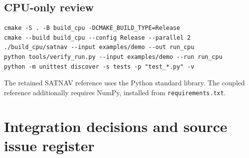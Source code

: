 \documentclass[11pt,a4paper]{article}
\newcommand{\code}[1]{\texttt{#1}}
\begin{document}
\subsection{CPU-only review}
\begin{lstlisting}
cmake -S . -B build_cpu -DCMAKE_BUILD_TYPE=Release
cmake --build build_cpu --config Release --parallel 2
./build_cpu/satnav --input examples/demo --out run_cpu
python tools/verify_run.py --input examples/demo --run run_cpu
python -m unittest discover -s tests -p "test_*.py" -v
\end{lstlisting}
The retained SATNAV reference uses the Python standard library. The coupled
reference additionally requires NumPy, installed from \code{requirements.txt}.
\clearpage

\section{Integration decisions and source issue register}
\small
\end{document}

